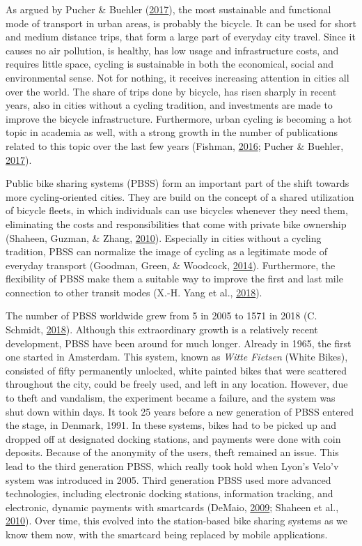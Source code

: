 \documentclass[12pt,oneside]{reedthesis}
\begin{document}
As argued by Pucher \& Buehler
(\protect\hyperlink{ref-pucher2017}{2017}), the most sustainable and
functional mode of transport in urban areas, is probably the bicycle. It
can be used for short and medium distance trips, that form a large part
of everyday city travel. Since it causes no air pollution, is healthy,
has low usage and infrastructure costs, and requires little space,
cycling is sustainable in both the economical, social and environmental
sense. Not for nothing, it receives increasing attention in cities all
over the world. The share of trips done by bicycle, has risen sharply in
recent years, also in cities without a cycling tradition, and
investments are made to improve the bicycle infrastructure. Furthermore,
urban cycling is becoming a hot topic in academia as well, with a strong
growth in the number of publications related to this topic over the last
few years (Fishman, \protect\hyperlink{ref-fishman2016}{2016}; Pucher \&
Buehler, \protect\hyperlink{ref-pucher2017}{2017}).

Public bike sharing systems (PBSS) form an important part of the shift
towards more cycling-oriented cities. They are build on the concept of a
shared utilization of bicycle fleets, in which individuals can use
bicycles whenever they need them, eliminating the costs and
responsibilities that come with private bike ownership (Shaheen, Guzman,
\& Zhang, \protect\hyperlink{ref-shaheen2010}{2010}). Especially in
cities without a cycling tradition, PBSS can normalize the image of
cycling as a legitimate mode of everyday transport (Goodman, Green, \&
Woodcock, \protect\hyperlink{ref-goodman2014}{2014}). Furthermore, the
flexibility of PBSS make them a suitable way to improve the first and
last mile connection to other transit modes (X.-H. Yang et al.,
\protect\hyperlink{ref-yang2018}{2018}).

The number of PBSS worldwide grew from 5 in 2005 to 1571 in 2018 (C.
Schmidt, \protect\hyperlink{ref-schmidt2018}{2018}). Although this
extraordinary growth is a relatively recent development, PBSS have been
around for much longer. Already in 1965, the first one started in
Amsterdam. This system, known as \emph{Witte Fietsen} (White Bikes),
consisted of fifty permanently unlocked, white painted bikes that were
scattered throughout the city, could be freely used, and left in any
location. However, due to theft and vandalism, the experiment became a
failure, and the system was shut down within days. It took 25 years
before a new generation of PBSS entered the stage, in Denmark, 1991. In
these systems, bikes had to be picked up and dropped off at designated
docking stations, and payments were done with coin deposits. Because of
the anonymity of the users, theft remained an issue. This lead to the
third generation PBSS, which really took hold when Lyon's Velo'v system
was introduced in 2005. Third generation PBSS used more advanced
technologies, including electronic docking stations, information
tracking, and electronic, dynamic payments with smartcards (DeMaio,
\protect\hyperlink{ref-demaio2009}{2009}; Shaheen et al.,
\protect\hyperlink{ref-shaheen2010}{2010}). Over time, this evolved into
the station-based bike sharing systems as we know them now, with the
smartcard being replaced by mobile applications.
\end{document}
